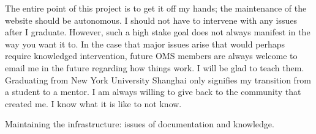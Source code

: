 The entire point of this project is to get it off my hands; the maintenance of the website should be autonomous. I should not have to intervene with any issues after I graduate. However, such a high stake goal does not always manifest in the way you want it to. In the case that major issues arise that would perhaps require knowledged intervention, future OMS members are always welcome to email me in the future regarding how things work. I will be glad to teach them. Graduating from New York University Shanghai only signifies my transition from a student to a mentor. I am always willing to give back to the community that created me. I know what it is like to not know.

Maintaining the infrastructure: issues of documentation and knowledge.
